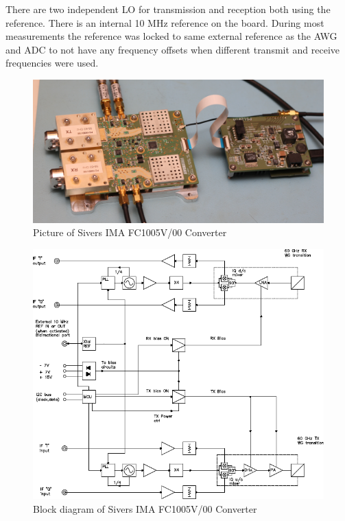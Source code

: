 There are two independent \gls{LO} for transmission and reception both using
the reference. There is an internal 10 MHz reference on the board. During
most measurements the reference was locked to same external reference as the
\gls{AWG} and \gls{ADC} to not have any frequency offsets when different
transmit and receive frequencies were used.

\begin{figure}[p]
  \centering
  \includegraphics[width=\textwidth]{pictures/sivers}
  \caption{Picture of Sivers IMA FC1005V/00 Converter}
  \label{fig:sivers}
\end{figure}

\begin{figure}[p]
  \centering
  \includegraphics[width=\textwidth]{figures/sivers_block_diagram}
  \caption{Block diagram of Sivers IMA FC1005V/00 Converter \cite{sivers_fc1005v}}
  \label{fig:sivers}
\end{figure}

